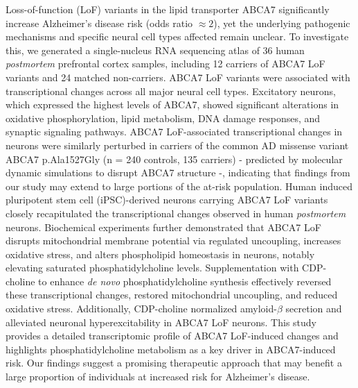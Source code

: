 Loss-of-function (LoF) variants in the lipid transporter ABCA7 significantly increase Alzheimer's disease risk (odds ratio $\approx  2$), yet the underlying pathogenic mechanisms and specific neural cell types affected remain unclear. To investigate this, we generated a single-nucleus RNA sequencing atlas of 36 human \textit{postmortem} prefrontal cortex samples, including 12 carriers of ABCA7 LoF variants and 24 matched non-carriers. ABCA7 LoF variants were associated with transcriptional changes across all major neural cell types. Excitatory neurons, which expressed the highest levels of ABCA7, showed significant alterations in oxidative phosphorylation, lipid metabolism, DNA damage responses, and synaptic signaling pathways. ABCA7 LoF-associated transcriptional changes in neurons were similarly perturbed in carriers of the common AD missense variant ABCA7 p.Ala1527Gly (n = 240 controls, 135 carriers) - predicted by molecular dynamic simulations to disrupt ABCA7 structure -, indicating that findings from our study may extend to large portions of the at-risk population. Human induced pluripotent stem cell (iPSC)-derived neurons carrying ABCA7 LoF variants closely recapitulated the transcriptional changes observed in human \textit{postmortem} neurons. Biochemical experiments further demonstrated that ABCA7 LoF disrupts mitochondrial membrane potential via regulated uncoupling, increases oxidative stress, and alters phospholipid homeostasis in neurons, notably elevating saturated phosphatidylcholine levels. Supplementation with CDP-choline to enhance \textit{de novo} phosphatidylcholine synthesis effectively reversed these transcriptional changes, restored mitochondrial uncoupling, and reduced oxidative stress. Additionally, CDP-choline normalized amyloid-$\beta$ secretion and alleviated neuronal hyperexcitability in ABCA7 LoF neurons. This study provides a detailed transcriptomic profile of ABCA7 LoF-induced changes and highlights phosphatidylcholine metabolism as a key driver in ABCA7-induced risk. Our findings suggest a promising therapeutic approach that may benefit a large proportion of individuals at increased risk for Alzheimer's disease.

